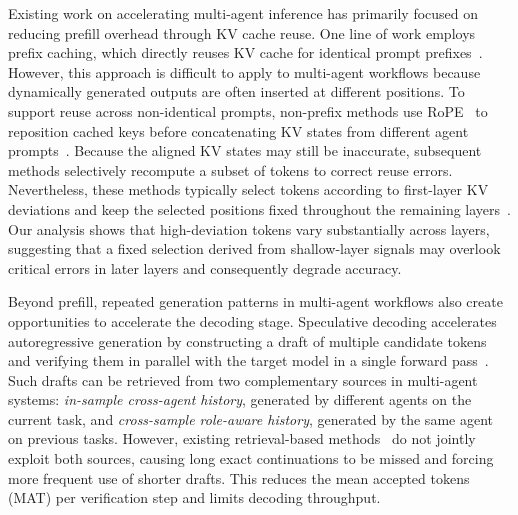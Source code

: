 \documentclass[letterpaper]{article} %
\begin{document}

Existing work on accelerating multi-agent inference has primarily focused on reducing prefill overhead through KV cache reuse. One line of work employs prefix caching, which directly reuses KV cache for identical prompt prefixes~\citep{DBLP:conf/sosp/KwonLZ0ZY0ZS23, DBLP:conf/nips/ZhengYXS0YCKSGB24}. However, this approach is difficult to apply to multi-agent workflows because dynamically generated outputs are often inserted at different positions. To support reuse across non-identical prompts, non-prefix methods use RoPE~\citep{DBLP:journals/ijon/SuALPBL24} to reposition cached keys before concatenating KV states from different agent prompts~\citep{DBLP:conf/fast/LiuG0WX0GHM26}. Because the aligned KV states may still be inaccurate, subsequent methods selectively recompute a subset of tokens to correct reuse errors. Nevertheless, these methods typically select tokens according to first-layer KV deviations and keep the selected positions fixed throughout the remaining layers~\citep{DBLP:conf/eurosys/YaoLLRCZD0J25}. Our analysis shows that high-deviation tokens vary substantially across layers, suggesting that a fixed selection derived from shallow-layer signals may overlook critical errors in later layers and consequently degrade accuracy.

Beyond prefill, repeated generation patterns in multi-agent workflows also create opportunities to accelerate the decoding stage. Speculative decoding accelerates autoregressive generation by constructing a draft of multiple candidate tokens and verifying them in parallel with the target model in a single forward pass~\citep{DBLP:conf/icml/LeviathanKM23}. Such drafts can be retrieved from two complementary sources in multi-agent systems: \textit{in-sample cross-agent history}, generated by different agents on the current task, and \textit{cross-sample role-aware history}, generated by the same agent on previous tasks. However, existing retrieval-based methods~\citep{DBLP:conf/acl/HuWZZLCZ25, DBLP:conf/acl/ZhangLZWZ26} do not jointly exploit both sources, causing long exact continuations to be missed and forcing more frequent use of shorter drafts. This reduces the mean accepted tokens (MAT) per verification step and limits decoding throughput.
\end{document}
